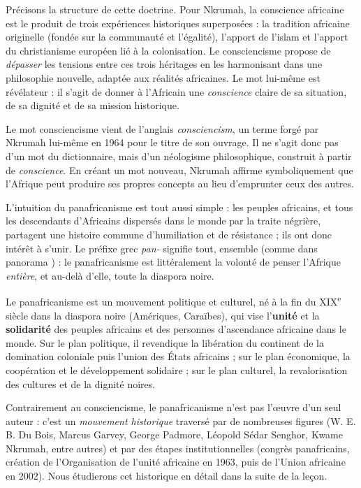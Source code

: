 \documentclass[11pt]{article}
\newcommand{\cle}[1]{{\popxbold\color{popdark}#1}}
\newcounter{popsec}
\newcounter{popsub}
\newcommand{\courssub}[1]{%
  \stepcounter{popsub}%
  \par\vspace{9pt}\noindent{\popxbold\fontsize{11.5}{13}\selectfont\color{popink}{\color{poporange}\thepopsec.\thepopsub}\hspace{6pt}#1}\par\nopagebreak\vspace{4pt}
}
\begin{document}
Précisons la structure de cette doctrine. Pour Nkrumah, la conscience africaine est le produit de trois expériences historiques superposées : la tradition africaine originelle (fondée sur la communauté et l'égalité), l'apport de l'islam et l'apport du christianisme européen lié à la colonisation. Le consciencisme propose de \emph{dépasser} les tensions entre ces trois héritages en les harmonisant dans une philosophie nouvelle, adaptée aux réalités africaines. Le mot lui-même est révélateur : il s'agit de donner à l'Africain une \emph{conscience} claire de sa situation, de sa dignité et de sa mission historique.

\begin{savaistu}
Le mot \og consciencisme \fg{} vient de l'anglais \emph{consciencism}, un terme forgé par Nkrumah lui-même en 1964 pour le titre de son ouvrage. Il ne s'agit donc pas d'un mot du dictionnaire, mais d'un néologisme philosophique, construit à partir de \emph{conscience}. En créant un mot nouveau, Nkrumah affirme symboliquement que l'Afrique peut produire ses propres concepts au lieu d'emprunter ceux des autres.
\end{savaistu}

\courssub{Définition du panafricanisme}

L'intuition du panafricanisme est tout aussi simple : les peuples africains, et tous les descendants d'Africains dispersés dans le monde par la traite négrière, partagent une histoire commune d'humiliation et de résistance ; ils ont donc intérêt à s'unir. Le préfixe grec \emph{pan-} signifie \og tout, ensemble \fg{} (comme dans \og panorama \fg{}) : le panafricanisme est littéralement la volonté de penser l'Afrique \emph{entière}, et au-delà d'elle, toute la diaspora noire.

\begin{definition}[Le panafricanisme]
Le \cle{panafricanisme} est un mouvement politique et culturel, né à la fin du XIX\textsuperscript{e} siècle dans la diaspora noire (Amériques, Caraïbes), qui vise l'\textbf{unité} et la \textbf{solidarité} des peuples africains et des personnes d'ascendance africaine dans le monde. Sur le plan politique, il revendique la libération du continent de la domination coloniale puis l'union des États africains ; sur le plan économique, la coopération et le développement solidaire ; sur le plan culturel, la revalorisation des cultures et de la dignité noires.
\end{definition}

Contrairement au consciencisme, le panafricanisme n'est pas l'œuvre d'un seul auteur : c'est un \emph{mouvement historique} traversé par de nombreuses figures (W. E. B. Du Bois, Marcus Garvey, George Padmore, Léopold Sédar Senghor, Kwame Nkrumah, entre autres) et par des étapes institutionnelles (congrès panafricains, création de l'Organisation de l'unité africaine en 1963, puis de l'Union africaine en 2002). Nous étudierons cet historique en détail dans la suite de la leçon.
\end{document}
